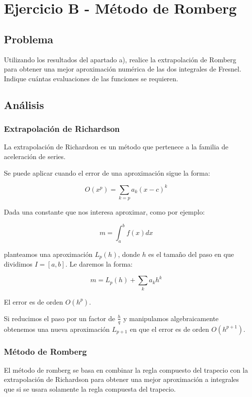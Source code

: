 \section{Ejercicio B - Método de Romberg}


\subsection{Problema}

Utilizando los resultados del apartado a), realice la extrapolación de Romberg para obtener una mejor aproximación numérica de las dos integrales de Fresnel. Indique cuántas evaluaciones de las funciones se requieren.


\subsection{Análisis}


\subsubsection{Extrapolación de Richardson}

La extrapolación de Richardson es un método que pertenece a la familia de aceleración de series.

Se puede aplicar cuando el error de una aproximación sigue la forma: 

$$
O(x^p) = \sum_{k=p} a_k (x - c)^k
$$

Dada una constante que nos interesa aproximar, como por ejemplo:

$$
m = \int_{a}^{b}  f(x) dx
$$

planteamos una aproximación $L_p(h)$, donde $h$ es el tamaño del paso en que dividimos $I = [a, b]$. Le daremos la forma: 

$$
m = L_p(h) + \sum_{k} a_k h^k
$$

El error es de orden $O(h^p)$.

	Si reducimos el paso por un factor de $\frac{h}{q}$ y manipulamos algebraicamente obtenemos una nueva aproximación $L_{p+1}$ en que el error es de orden $O(h^{p+1})$.


\subsubsection{Método de Romberg}

El método de romberg se basa en combinar la regla compuesto del trapecio con la extrapolación de Richardson para obtener una mejor aproximación a integrales que si se usara solamente la regla compuesta del trapecio.

